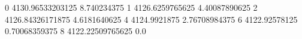 0 4130.96533203125 8.740234375
1 4126.6259765625 4.40087890625
2 4126.84326171875 4.6181640625
4 4124.9921875 2.76708984375
6 4122.92578125 0.70068359375
8 4122.22509765625 0.0
